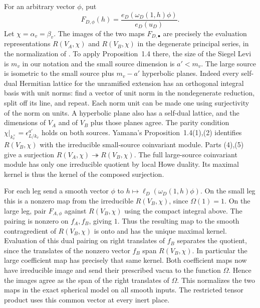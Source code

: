For an arbitrary vector \(\phi\), put
\[
 F_{D,\phi}(h)=\frac{e_D(\omega_D(1,h)\phi)}{e_D(u_D)}.
\]
Let \(\chi=\alpha_v=\beta_v\). The images of the two
maps \(F_{D,\bullet}\) are precisely the evaluation
representations \(R(V_A,\chi)\) and \(R(V_B,\chi)\)
in the degenerate principal series, in the normalization
of \cite[\S1]{tr3yamana}. To apply Proposition~1.4
there, the size of the Siegel Levi is \(m_v\) in our notation
and the small source dimension is \(a'<m_v\).
The large source is isometric to the small source plus
\(m_v-a'\) hyperbolic planes. Indeed every self-dual
Hermitian lattice for the unramified extension has an
orthogonal integral basis with unit norms: find a vector
of unit norm in the nondegenerate reduction, split off
its line, and repeat. Each norm unit can be made one
using surjectivity of the norm on units. A hyperbolic
plane also has a self-dual lattice, and the dimensions
of \(V_A\) and of \(V_B\) plus those planes agree.
The parity condition \(\chi|_{k_v^\times}=\epsilon_{L/k_v}^{a'}\)
holds on both sources. Yamana's Proposition~1.4(1),(2)
identifies \(R(V_B,\chi)\) with the irreducible small-source
coinvariant module. Parts (4),(5) give a surjection
\(R(V_A,\chi)\twoheadrightarrow R(V_B,\chi)\).
The full large-source coinvariant module has only one
irreducible quotient by local Howe duality. Its maximal
kernel is thus the kernel of the composed surjection.
\cite[Proposition~1.4(1),(2),(4),(5)]{tr3yamana}
\cite[Theorem~1.2]{p2flip-gan-takeda}

For each leg send a smooth vector \(\phi\) to
\(h\mapsto\ell_D(\omega_D(1,h)\phi)\).
On the small leg this is a nonzero map from the
irreducible \(R(V_B,\chi)\), since \(\Omega(1)=1\).
On the large leg, pair \(F_{A,\phi}\) against
\(R(V_B,\chi)\) using the compact integral above. The
pairing is nonzero on \(f_A,f_B\), giving \(1\).
Thus the resulting map to the smooth contragredient of
\(R(V_B,\chi)\) is onto and has the unique maximal kernel.
Evaluation of this dual pairing on right translates
of \(f_B\) separates the quotient, since the translates
of the nonzero vector \(f_B\) span \(R(V_B,\chi)\).
In particular the large coefficient map has precisely
that same kernel. Both coefficient maps now have
irreducible image and send their prescribed vacua to
the function \(\Omega\). Hence the images agree as the
span of the right translates of \(\Omega\). This normalizes
the two maps in the exact spherical model on all smooth
inputs. The restricted tensor product uses this common
vector at every inert place.

